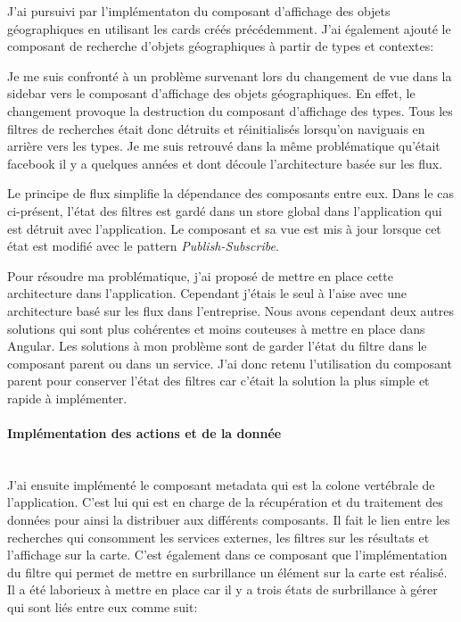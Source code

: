 \documentclass{rapportUHA40}
\begin{document}
J'ai pursuivi par l'implémentaton du composant d'affichage des objets
géographiques en utilisant les cards créés précédemment. J'ai également ajouté
le composant de recherche d'objets géographiques à partir de types et
contextes: 

Je me suis confronté à un problème survenant lors du changement de vue dans la
sidebar vers le composant d'affichage des objets géographiques. En effet, le
changement provoque la destruction du composant d'affichage des types. Tous les
filtres de recherches était donc détruits et réinitialisés lorsqu'on naviguais
en arrière vers les types. Je me suis retrouvé dans la même problématique
qu'était facebook il y a quelques années et dont découle l'architecture basée
sur les flux.


Le principe de flux simplifie la dépendance des composants entre eux. Dans le
cas ci-présent, l'état des filtres est gardé dans un store global dans
l'application qui est détruit avec l'application. Le composant et sa vue est
mis à jour lorsque cet état est modifié avec le pattern
\textit{Publish-Subscribe}.

Pour résoudre ma problématique, j'ai proposé de mettre en place cette
architecture dans l'application. Cependant j'étais le seul à l'aise avec une
architecture basé sur les flux dans l'entreprise. Nous avons cependant deux
autres solutions qui sont plus cohérentes et moins couteuses à mettre en place
dans Angular. Les solutions à mon problème sont de garder l'état du filtre dans
le composant parent ou dans un service. J'ai donc retenu l'utilisation du
composant parent pour conserver l'état des filtres car c'était la solution la
plus simple et rapide à implémenter.\\

\paragraph{Implémentation des actions et de la donnée}\mbox{}\\
J'ai ensuite implémenté le composant metadata qui est la colone vertébrale de
l'application. C'est lui qui est en charge de la récupération et du
traitement des données pour ainsi la distribuer aux différents composants. Il
fait le lien entre les recherches qui consomment les services externes, les
filtres sur les résultats et l'affichage sur la carte. C'est également dans ce
composant que l'implémentation du filtre  \fg{} qui permet de mettre en
surbrillance un élément sur la carte est réalisé. Il a été laborieux à mettre
en place car il y a trois états de surbrillance à gérer qui sont liés entre eux
comme suit:
\end{document}
